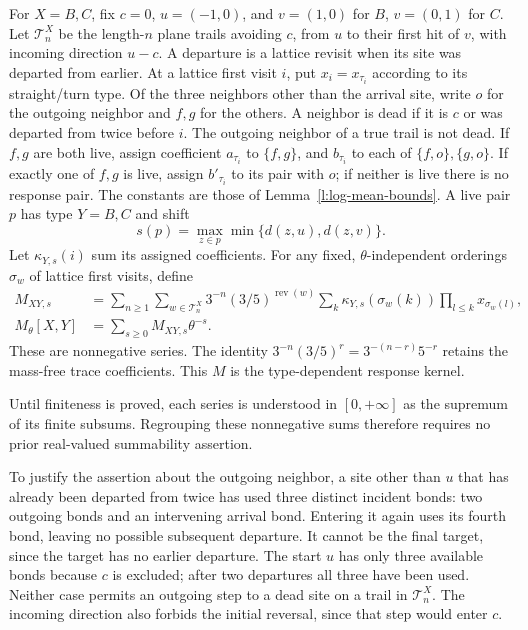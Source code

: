 \begin{definition}\label{d:kernel}
For \(X=B,C\), fix \(c=0\), \(u=(-1,0)\), and \(v=(1,0)\)
for \(B\), \(v=(0,1)\) for \(C\).
Let \(\mathcal T_n^X\) be the length-\(n\) plane trails avoiding \(c\),
from \(u\) to their first hit of \(v\), with incoming direction \(u-c\).
A departure is a lattice revisit when its site was departed from earlier.
At a lattice first visit \(i\), put \(x_i=x_{\tau_i}\) according to
its straight/turn type. Of the three neighbors other than the arrival
site, write \(o\) for the outgoing neighbor and \(f,g\) for the others.
A neighbor is dead if it is \(c\) or was departed from twice before \(i\).
The outgoing neighbor of a true trail is not dead.
If \(f,g\) are both live, assign coefficient \(a_{\tau_i}\) to
\(\{f,g\}\), and \(b_{\tau_i}\) to each of \(\{f,o\},\{g,o\}\).
If exactly one of \(f,g\) is live, assign \(b'_{\tau_i}\) to its
pair with \(o\); if neither is live there is no response pair.
The constants are those of Lemma~\ref{l:log-mean-bounds}.
A live pair \(p\) has type \(Y=B,C\) and shift
\[
 s(p)=\max_{z\in p}\min\{d(z,u),d(z,v)\}.
\]
Let \(\kappa_{Y,s}(i)\) sum its assigned coefficients.
For any fixed, \(\theta\)-independent orderings \(\sigma_w\) of lattice
first visits, define
\[
 \begin{split}
 M_{XY,s}
 &=\sum_{n\ge1}\sum_{w\in\mathcal T_n^X}
     3^{-n}(3/5)^{\operatorname{rev}(w)}
     \sum_k\kappa_{Y,s}(\sigma_w(k))
                   \prod_{l\le k}x_{\sigma_w(l)},\\
 M_\theta[X,Y]&=\sum_{s\ge0}M_{XY,s}\theta^{-s}.
 \end{split}
\]
These are nonnegative series. The identity
\(3^{-n}(3/5)^r=3^{-(n-r)}5^{-r}\) retains the mass-free
trace coefficients. This \(M\) is the type-dependent response kernel.
\end{definition}

Until finiteness is proved, each series is understood in
\([0,+\infty]\) as the supremum of its finite subsums.
Regrouping these nonnegative sums therefore requires no prior
real-valued summability assertion.

To justify the assertion about the outgoing neighbor, a site other
than \(u\) that has already been departed from twice has used three
distinct incident bonds: two outgoing bonds and an intervening
arrival bond.  Entering it again uses its fourth bond, leaving no
possible subsequent departure.  It cannot be the final target,
since the target has no earlier departure.  The start \(u\) has
only three available bonds because \(c\) is excluded; after two
departures all three have been used.  Neither case permits an
outgoing step to a dead site on a trail in \(\mathcal T_n^X\).
The incoming direction also forbids the initial reversal, since that
step would enter \(c\).

